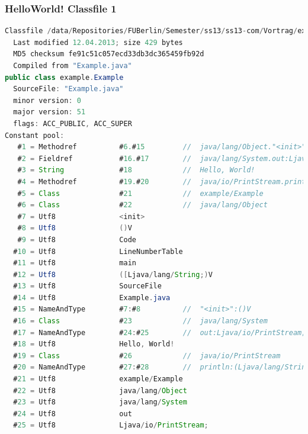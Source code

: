 \documentclass[10pt]{beamer}
\begin{document}

\begin{frame}[fragile]
\frametitle{HelloWorld! Classfile 1}
\begin{lstlisting}[language=Java,basicstyle=\ttfamily\tiny]
Classfile /data/Repositories/FUBerlin/Semester/ss13/ss13-com/Vortrag/example/Example.class
  Last modified 12.04.2013; size 429 bytes
  MD5 checksum fe91c51c057ecd33db3dc365459fb92d
  Compiled from "Example.java"
public class example.Example
  SourceFile: "Example.java"
  minor version: 0
  major version: 51
  flags: ACC_PUBLIC, ACC_SUPER
Constant pool:
   #1 = Methodref          #6.#15         //  java/lang/Object."<init>":()V
   #2 = Fieldref           #16.#17        //  java/lang/System.out:Ljava/io/PrintStream;
   #3 = String             #18            //  Hello, World!
   #4 = Methodref          #19.#20        //  java/io/PrintStream.println:(Ljava/lang/String;)V
   #5 = Class              #21            //  example/Example
   #6 = Class              #22            //  java/lang/Object
   #7 = Utf8               <init>
   #8 = Utf8               ()V
   #9 = Utf8               Code
  #10 = Utf8               LineNumberTable
  #11 = Utf8               main
  #12 = Utf8               ([Ljava/lang/String;)V
  #13 = Utf8               SourceFile
  #14 = Utf8               Example.java
  #15 = NameAndType        #7:#8          //  "<init>":()V
  #16 = Class              #23            //  java/lang/System
  #17 = NameAndType        #24:#25        //  out:Ljava/io/PrintStream;
  #18 = Utf8               Hello, World!
  #19 = Class              #26            //  java/io/PrintStream
  #20 = NameAndType        #27:#28        //  println:(Ljava/lang/String;)V
  #21 = Utf8               example/Example
  #22 = Utf8               java/lang/Object
  #23 = Utf8               java/lang/System
  #24 = Utf8               out
  #25 = Utf8               Ljava/io/PrintStream;
\end{lstlisting}
\end{frame}

\end{document}
